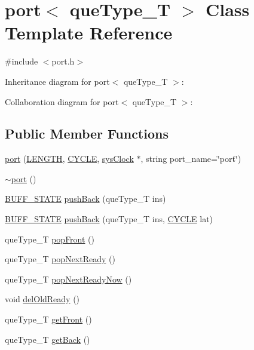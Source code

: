 \hypertarget{classport}{
\section{port$<$ queType\_\-T $>$ Class Template Reference}
\label{classport}
}


{\ttfamily \#include $<$port.h$>$}



Inheritance diagram for port$<$ queType\_\-T $>$:


Collaboration diagram for port$<$ queType\_\-T $>$:
\subsection*{Public Member Functions}
\begin{DoxyCompactItemize}
\item 
\hyperlink{classport_abcad2f2fb15e1d6b426f455d4e2d053d}{port} (\hyperlink{binaryTranslator_2global_8h_a9f35cc405c37836572563f16d0302ba6}{LENGTH}, \hyperlink{global_2global_8h_a7e19a550ec11d1ed921deb20c22efb5b}{CYCLE}, \hyperlink{classsysClock}{sysClock} $\ast$, string port\_\-name=\char`\"{}port\char`\"{})
\item 
\hyperlink{classport_a51a6e901a1eac3a1c3fd35a140fecbfb}{$\sim$port} ()
\item 
\hyperlink{global_2global_8h_a8bd4ea2582a6025c1cfe99bf9947489c}{BUFF\_\-STATE} \hyperlink{classport_a4c80b61961d7df8f30f5dc42bacd25e9}{pushBack} (queType\_\-T ins)
\item 
\hyperlink{global_2global_8h_a8bd4ea2582a6025c1cfe99bf9947489c}{BUFF\_\-STATE} \hyperlink{classport_a8660727a8dbc674388195c7abd543045}{pushBack} (queType\_\-T ins, \hyperlink{global_2global_8h_a7e19a550ec11d1ed921deb20c22efb5b}{CYCLE} lat)
\item 
queType\_\-T \hyperlink{classport_a4fc45954f3836ec5d9d1808bdd8acff3}{popFront} ()
\item 
queType\_\-T \hyperlink{classport_a4593f9dfb524f8d7958e03ab4a27cb4f}{popNextReady} ()
\item 
queType\_\-T \hyperlink{classport_a7645b2e6cc4f44937e8047fecd853c95}{popNextReadyNow} ()
\item 
void \hyperlink{classport_a9fe248323f061226103808bac3cb5118}{delOldReady} ()
\item 
queType\_\-T \hyperlink{classport_afe64047b4e7df87d4a031097ea159852}{getFront} ()
\item 
queType\_\-T \hyperlink{classport_a53d30f96ac41c4f3a60174cd66b1656e}{getBack} ()

\end{DoxyCompactItemize}
